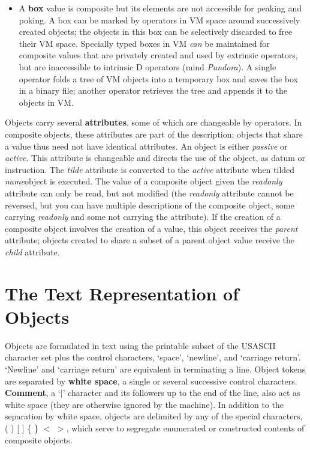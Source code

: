 \begin{itemize}
\item A \textbf{box} value is composite but its elements are not accessible for peaking and poking. A box can be marked by operators in VM space around successively created objects; the objects in this box can be selectively discarded to free their VM space. Specially typed boxes in VM \emph{can} be maintained for composite values that are privately created and used by extrinsic operators, but are inaccessible to intrinsic D operators (mind \emph{Pandora}). A single operator folds a tree of VM objects into a temporary box and saves the box in a binary file; another operator retrieves the tree and appends it to the objects in VM.
\end{itemize}

Objects  carry several \textbf{attributes}, some of which are changeable by operators. In composite objects,  these  attributes  are part  of the description;  objects that share a value thus need not  have identical  attributes.  An  object  is either  \emph{passive} or  \emph{active}.  This attribute  is changeable  and directs the use of the object,  as datum  or instruction. The \emph{tilde} attribute is converted to the \emph{active} attribute when tilded \emph{name}object is executed. The value of a composite object given the \emph{readonly} attribute can only be read,  but not modified (the \emph{readonly} attribute cannot be reversed, but you can have multiple descriptions of the composite object, some carrying \emph{readonly} and some not carrying the attribute). If the creation of a composite object involves the creation of a value,  this  object receives the \emph{parent} attribute;  objects  created  to share  a subset of a parent object value receive the \emph{child} attribute.

\section{The Text Representation of Objects}\label{sec:textobjects}

Objects are formulated in text using the printable subset of the USASCII character set  plus  the control characters,  `space', `newline', and `carriage return'. `Newline' and `carriage return' are equivalent in terminating a line. Object  tokens  are  separated  by \textbf{white  space},  a  single  or  several successive control characters. \textbf{Comment}, a `$|$' character and its followers up  to the end of the line, also act as white space (they  are  otherwise ignored by the machine).  In  addition  to the separation by white  space,  objects  are  delimited by any of the special characters,  ( ) [ ] \{ \} $<$ $>$, which serve to segregate enumerated or constructed contents of composite objects.

